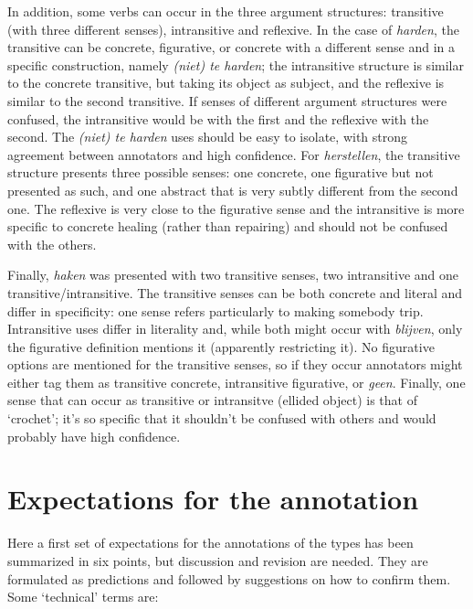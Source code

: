 \documentclass[
]{book}
\begin{document}
In addition, some verbs can occur in the three argument structures: transitive (with three different senses), intransitive and reflexive.
In the case of \emph{harden}, the transitive can be concrete, figurative, or concrete with a different sense and in a specific construction, namely \emph{(niet) te harden}; the intransitive structure is similar to the concrete transitive, but taking its object as subject, and the reflexive is similar to the second transitive. If senses of different argument structures were confused, the intransitive would be with the first and the reflexive with the second. The \emph{(niet) te harden} uses should be easy to isolate, with strong agreement between annotators and high confidence.
For \emph{herstellen}, the transitive structure presents three possible senses: one concrete, one figurative but not presented as such, and one abstract that is very subtly different from the second one. The reflexive is very close to the figurative sense and the intransitive is more specific to concrete healing (rather than repairing) and should not be confused with the others.

Finally, \emph{haken} was presented with two transitive senses, two intransitive and one transitive/intransitive. The transitive senses can be both concrete and literal and differ in specificity: one sense refers particularly to making somebody trip. Intransitive uses differ in literality and, while both might occur with \emph{blijven}, only the figurative definition mentions it (apparently restricting it). No figurative options are mentioned for the transitive senses, so if they occur annotators might either tag them as transitive concrete, intransitive figurative, or \emph{geen}. Finally, one sense that can occur as transitive or intransitve (ellided object) is that of `crochet'; it's so specific that it shouldn't be confused with others and would probably have high confidence.

\hypertarget{expectations-for-the-annotation}{%
\section{Expectations for the annotation}\label{expectations-for-the-annotation}}

Here a first set of expectations for the annotations of the types has been summarized in six points, but discussion and revision are needed. They are formulated as predictions and followed by suggestions on how to confirm them. Some `technical' terms are:
\end{document}
